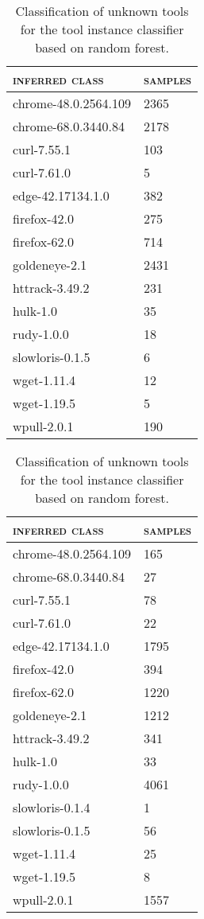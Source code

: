 \begin{table}[H]
\begin{subtable}{.45\linewidth}
	\caption{Classification of \textsc{grabsite-2.1.16}.}
	\end{subtable}
	\begin{subtable}{.45\linewidth}
		\centering
	\begin{tabular}{ll}
		\toprule
		\textsc{inferred class} & \textsc{samples}\\
		\midrule
		chrome-48.0.2564.109 & 2365\\
		chrome-68.0.3440.84 & 2178\\
		curl-7.55.1 & 103\\
		curl-7.61.0 & 5\\
		edge-42.17134.1.0 & 382\\
		firefox-42.0 & 275\\
		firefox-62.0 & 714\\
		goldeneye-2.1 & 2431\\
		httrack-3.49.2 & 231\\
		hulk-1.0 & 35\\
		rudy-1.0.0 & 18\\
		slowloris-0.1.5 & 6\\
		wget-1.11.4 & 12\\
		wget-1.19.5 & 5\\
		wpull-2.0.1 & 190\\
		\bottomrule
	\end{tabular}
	\caption{Classification of \textsc{opera-62.0.3331.66}.}
	\end{subtable}
	\begin{subtable}{.45\linewidth}
		\centering
	\begin{tabular}{ll}
		\toprule
		\textsc{inferred class} & \textsc{samples}\\
		\midrule
		chrome-48.0.2564.109 & 165\\
		chrome-68.0.3440.84 & 27\\
		curl-7.55.1 & 78\\
		curl-7.61.0 & 22\\
		edge-42.17134.1.0 & 1795\\
		firefox-42.0 & 394\\
		firefox-62.0 & 1220\\
		goldeneye-2.1 & 1212\\
		httrack-3.49.2 & 341\\
		hulk-1.0 & 33\\
		rudy-1.0.0 & 4061\\
		slowloris-0.1.4 & 1\\
		slowloris-0.1.5 & 56\\
		wget-1.11.4 & 25\\
		wget-1.19.5 & 8\\
		wpull-2.0.1 & 1557\\
		\bottomrule
	\end{tabular}
	\caption{Classification of \textsc{slowhttptest-1.6}.}
	\end{subtable}
	\caption{Classification of unknown tools for the tool instance classifier based on random forest.}
	\label{tab:unknown_application_long_random_forest}
\end{table}
